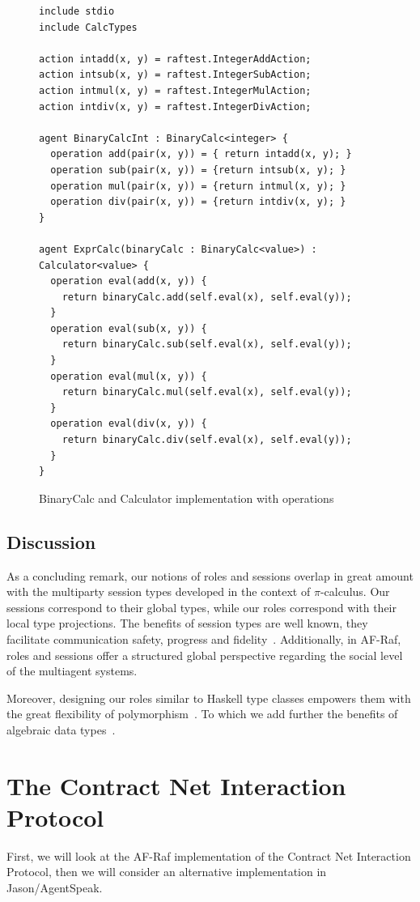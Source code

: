 \documentclass[a4paper,12pt,oneside,fleqn]{book} %
\begin{document}
\begin{figure}\footnotesize %
\begin{verbatim}
include stdio
include CalcTypes

action intadd(x, y) = raftest.IntegerAddAction;
action intsub(x, y) = raftest.IntegerSubAction;
action intmul(x, y) = raftest.IntegerMulAction;
action intdiv(x, y) = raftest.IntegerDivAction;

agent BinaryCalcInt : BinaryCalc<integer> {
  operation add(pair(x, y)) = { return intadd(x, y); }
  operation sub(pair(x, y)) = {return intsub(x, y); }
  operation mul(pair(x, y)) = {return intmul(x, y); }
  operation div(pair(x, y)) = {return intdiv(x, y); }
}

agent ExprCalc(binaryCalc : BinaryCalc<value>) : Calculator<value> {
  operation eval(add(x, y)) {
    return binaryCalc.add(self.eval(x), self.eval(y));
  }
  operation eval(sub(x, y)) {
    return binaryCalc.sub(self.eval(x), self.eval(y));
  }
  operation eval(mul(x, y)) {
    return binaryCalc.mul(self.eval(x), self.eval(y));
  }
  operation eval(div(x, y)) {
    return binaryCalc.div(self.eval(x), self.eval(y));
  }
}
\end{verbatim}
\caption{BinaryCalc and Calculator implementation with operations}
\label{fig:calc-op}
\end{figure} %
\subsection{Discussion} %
As a concluding remark, our notions of roles and sessions overlap in great
amount with the multiparty session types developed in the context of
$\pi$-calculus. Our sessions correspond to their global types, while our
roles correspond with their local type projections. The benefits of session
types are well known, they facilitate communication safety, progress and
fidelity~\cite{dblp:conf/popl/hondayc08}. Additionally, in AF-Raf, roles and
sessions offer a structured global perspective regarding the social level
of the multiagent systems.

Moreover, designing our roles similar to Haskell type classes empowers them
with the great flexibility of polymorphism~\cite{DBLP:conf/popl/WadlerB89}.
To which we add further the benefits of algebraic data
types~\cite{DBLP:journals/acta/GuttagH78}.
\section{The Contract Net Interaction Protocol} %
First, we will look at the AF-Raf implementation of the Contract Net
Interaction Protocol, then we will consider an alternative implementation
in Jason/AgentSpeak.
\end{document}
